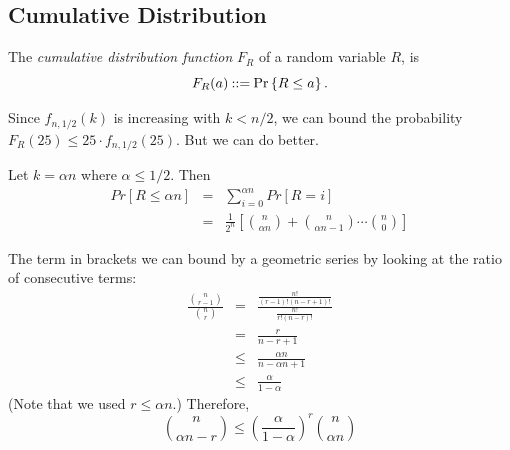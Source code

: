 \documentclass[11pt,twoside]{article}
\begin{document}
\subsection{Cumulative Distribution}
The {\em cumulative distribution function} $F_R$ of a random variable
$R$, is
\[
F_R(a) \mathbin{::=} \mathop{\textup{Pr}}\nolimits\left\{R \le a\right\}.
\]

Since $f_{n,1/2}(k)$ is increasing with $k<n/2$, we can bound the
probability $F_R(25) \le 25\cdot f_{n,1/2}(25)$.  But we can do better.

Let $k = \alpha n$ where $\alpha \le 1/2$. Then
\begin{eqnarray*}
Pr[R\leq \alpha n]
  &=& \sum_{i=0}^{\alpha n} Pr[R=i] \\
  &=& \frac{1}{2^n}\left[ \binom{n}{\alpha n}+\binom{n}{\alpha n - 1}
  \cdots \binom{n}{0} \right]
\end{eqnarray*}

The term in brackets we can bound by a geometric series by looking
at the ratio of consecutive terms:
\begin{eqnarray*}
\frac{\binom{n}{r-1}}{\binom{n}{r}} &=&
\frac{\frac{n!}{(r-1)!(n-r+1)!}}{\frac{n!}{r!(n-r)!}}\\
&=& \frac{r}{n-r+1}\\
&\leq& \frac{\alpha n}{n- \alpha n + 1}\\
&\leq& \frac{\alpha}{1-\alpha}
\end{eqnarray*}
(Note that we used $r \leq \alpha n$.)
Therefore,
\[
\binom{n}{\alpha n - r} \le
\left(\frac{\alpha}{1-\alpha}\right)^r\binom{n}{\alpha n}
\]
\end{document}
